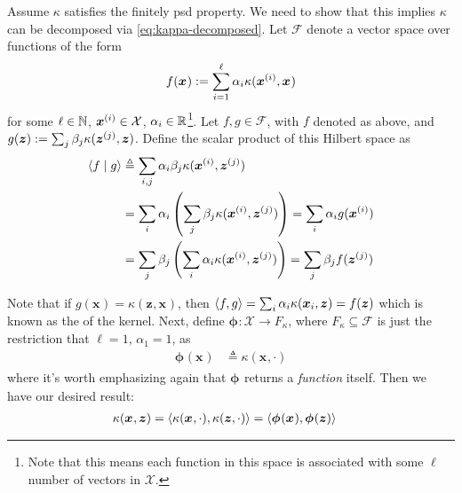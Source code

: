 \documentclass[11pt]{article}
\renewcommand\vec[2][]{\bm{#2}_{#1}}
\newcommand\mc{\mathcal}
\begin{document}
\begin{example}
	Assume $\kappa$ satisfies the finitely psd property. We need to show that this implies $\kappa$ can be decomposed via \ref{eq:kappa-decomposed}. Let $\mc F$ denote a vector space over functions of the form 
	\begin{align}
		f(\vec x) := \sum_{i=1}^{\ell} \alpha_i \kappa(\ivec[i]{x}, \vec x)
	\end{align}
	for some $\ell \in \mathbb{N}$, $\ivec[i]{x} \in \mc X$, $\alpha_i \in \mathbb{R}$\footnote{\tiny Note that this means each function in this space is associated with some $\ell$ number of vectors in $\mathcal X$.}. Let $f, g \in \mc F$, with $f$ denoted as above, and $g(\vec z) := \sum_j \beta_j \kappa(\ivec[j]{z}, \vec z)$. Define the scalar product of this Hilbert space as 
	\begin{align}
		\braket{f \mid g}
		&\triangleq \sum_{i,j} \alpha_i \beta_j \kappa(\ivec[i]{x}, \ivec[j]{z}) \\
		&= \sum_i \alpha_i \lr{ \sum_j \beta_j \kappa(\ivec[i]{x}, \ivec[j]{z}) } = \sum_i \alpha_i g(\ivec[i]{x})  \\
		&= \sum_j \beta_j \lr{ \sum_i \alpha_i    \kappa(\ivec[i]{x}, \ivec[j]{z}) } = \sum_j \beta_j f(\ivec[j]{z})
	\end{align}
	
	Note that if $g(\vec x) = \kappa(\vec z, \vec x)$, then \( \innerprod{f}{g}
	= \sum_{i} \alpha_i \kappa(\vec[i]{x}, \vec z) = f(\vec z) \) which is known as the  of the kernel. Next, define $\vec\phi : \mc X \to F_{\kappa}$, where $F_{\kappa} \subseteq \mc F$ is just the restriction that $\ell = 1$, $\alpha_1 = 1$, as
	\begin{align}
		\vec\phi(\vec x) &\triangleq \kappa(\vec x, \cdot)
	\end{align}
	where it's worth emphasizing again that $\vec\phi$ returns a \textit{function} itself. Then we have our desired result:
	\begin{align}
		\kappa(\vec x, \vec z)
		&= \innerprod{\kappa(\vec x, \cdot)}{\kappa(\vec z, \cdot)}
		= \innerprod{\vec\phi(\vec x)}{\vec\phi(\vec z)}
	\end{align}
\end{example}
\end{document}
